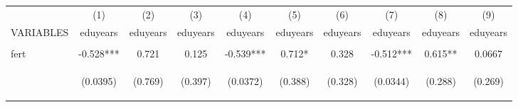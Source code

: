 \documentclass[]{article}
\begin{document}
\begin{center}
\begin{tabular}{lccccccccc} \hline
 & (1) & (2) & (3) & (4) & (5) & (6) & (7) & (8) & (9) \\
VARIABLES & eduyears & eduyears & eduyears & eduyears & eduyears & eduyears & eduyears & eduyears & eduyears \\ \hline
\vspace{4pt} & \begin{footnotesize}\end{footnotesize} & \begin{footnotesize}\end{footnotesize} & \begin{footnotesize}\end{footnotesize} & \begin{footnotesize}\end{footnotesize} & \begin{footnotesize}\end{footnotesize} & \begin{footnotesize}\end{footnotesize} & \begin{footnotesize}\end{footnotesize} & \begin{footnotesize}\end{footnotesize} & \begin{footnotesize}\end{footnotesize} \\
fert & -0.528*** & 0.721 & 0.125 & -0.539*** & 0.712* & 0.328 & -0.512*** & 0.615** & 0.0667 \\
\vspace{4pt} & \begin{footnotesize}(0.0395)\end{footnotesize} & \begin{footnotesize}(0.769)\end{footnotesize} & \begin{footnotesize}(0.397)\end{footnotesize} & \begin{footnotesize}(0.0372)\end{footnotesize} & \begin{footnotesize}(0.388)\end{footnotesize} & \begin{footnotesize}(0.328)\end{footnotesize} & \begin{footnotesize}(0.0344)\end{footnotesize} & \begin{footnotesize}(0.288)\end{footnotesize} & \begin{footnotesize}(0.269)\end{footnotesize} \\

\end{tabular}
\end{center}
\end{document}
